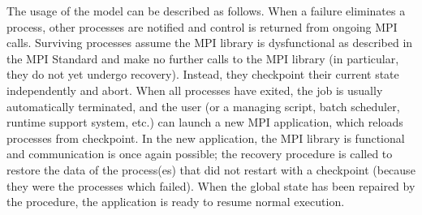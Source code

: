 


The usage of the \cof model can be described as follows. When a failure
eliminates a process, other processes are notified and control is returned from
ongoing MPI calls. Surviving processes assume the MPI library is dysfunctional
as described in the MPI Standard and make no further calls to the MPI library
(in particular, they do not yet undergo \abft recovery). Instead, they
checkpoint their current state independently and abort. When all processes have
exited, the job is usually automatically terminated, and the user (or a managing
script, batch scheduler, runtime support system, etc.) can launch a new MPI
application, which reloads processes from checkpoint. In the new application,
the MPI library is functional and communication is once again possible; the
\abft recovery procedure is called to restore the data of the process(es) that
did not restart with a checkpoint (because they were the processes which
failed). When the global state has been repaired by the \abft procedure, the
application is ready to resume normal execution.

